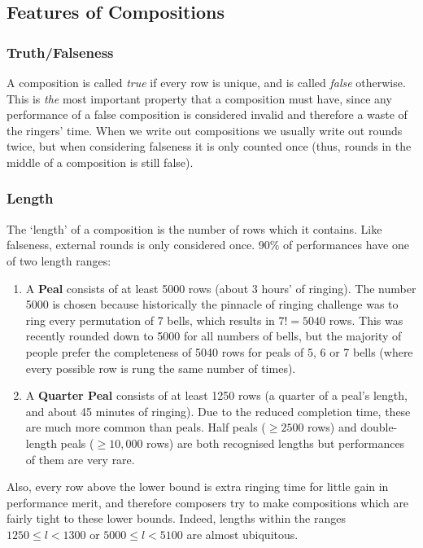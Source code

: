 \documentclass[12pt]{article}
\begin{document}
\subsection{Features of Compositions}

\subsubsection{Truth/Falseness}

A composition is called \emph{true} if every row is unique, and is called \emph{false} otherwise.
This is \emph{the} most important property that a composition must have, since any performance of a
false composition is considered invalid and therefore a waste of the ringers' time.  When we write
out compositions we usually write out rounds twice, but when considering falseness it is only
counted once (thus, rounds in the middle of a composition is still false).

\subsubsection{Length}

The `length' of a composition is the number of rows which it contains.  Like falseness, external
rounds is only considered once.  90\% of performances have one of two length ranges:

\begin{enumerate}
    \item A \textbf{Peal} consists of at least 5000 rows (about 3 hours' of ringing).
        The number 5000 is chosen because historically the pinnacle of ringing challenge was to ring
        every permutation of 7 bells, which results in $7! = 5040$ rows.  This was recently rounded
        down to 5000 for all numbers of bells, but the majority of people prefer the completeness of
        5040 rows for peals of 5, 6 or 7 bells (where every possible row is rung the same number of
        times).
    \item A \textbf{Quarter Peal} consists of at least 1250 rows (a quarter of a peal's length, and
        about 45 minutes of ringing).  Due to the reduced completion time, these are much more
        common than peals.  Half peals ($\ge 2500$ rows) and double-length peals ($\ge 10,000$ rows)
        are both recognised lengths but performances of them are very rare.
\end{enumerate}

Also, every row above the lower bound is extra ringing time for little gain in performance merit,
and therefore composers try to make compositions which are fairly tight to these lower bounds.
Indeed, lengths within the ranges $1250 \le l < 1300$ or $5000 \le l < 5100$ are almost ubiquitous.
\end{document}
